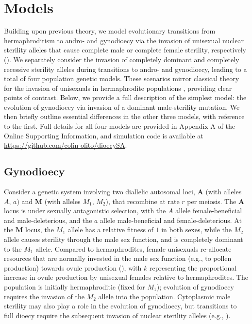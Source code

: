 \documentclass{article}
\begin{document}
\section*{Models} \label{sec:Models}

Building upon previous theory, we model evolutionary transitions from hermaphroditism to andro- and gynodioecy via the invasion of unisexual nuclear sterility alleles that cause complete male or complete female sterility, respectively (\citealt{Charlesworth1978a}). We separately consider the invasion of completely dominant and completely recessive sterility alleles during transitions to andro- and gynodioecy, leading to a total of four population genetic models. These scenarios mirror classical theory for the invasion of unisexuals in hermaphrodite populations \citep{Charlesworth1978a}, providing clear points of contrast. Below, we provide a full description of the simplest model: the evolution of gynodioecy via invasion of a dominant male-sterility mutation. We then briefly outline essential differences in the other three models, with reference to the first. Full details for all four models are provided in Appendix A of the Online Supporting Information, and simulation code is available at \url{https://github.com/colin-olito/dioecySA}.

\subsection*{Gynodioecy}

Consider a genetic system involving two diallelic autosomal loci, $\mathbf{A}$ (with alleles $A$, $a$) and $\mathbf{M}$ (with alleles $M_1$, $M_2$), that recombine at rate $r$ per meiosis. The $\mathbf{A}$ locus is under sexually antagonistic selection, with the $A$ allele female-beneficial and male-deleterious, and the $a$ allele male-beneficial and female-deleterious. At the $\mathbf{M}$ locus, the $M_1$ allele has a relative fitness of $1$ in both sexes, while the $M_2$ allele causes sterility through the male sex function, and is completely dominant to the $M_1$ allele. Compared to hermaphrodites, female unisexuals re-allocate resources that are normally invested in the male sex function (e.g., to pollen production) towards ovule production (\citealt{Lloyd1975,Lloyd1976,Charlesworth1978a}), with $k$ representing the proportional increase in ovule production by unisexual females relative to hermaphrodites. The population is initially hermaphroditic (fixed for $M_1$); evolution of gynodioecy requires the invasion of the $M_2$ allele into the population. Cytoplasmic male sterility may also play a role in the evolution of gynodioecy, but transitions to full dioecy require the subsequent invasion of nuclear sterility alleles (e.g., \citealt{Lewis1941,Frank1989,Charlesworth2006,Charlesworth2002}).
\end{document}
